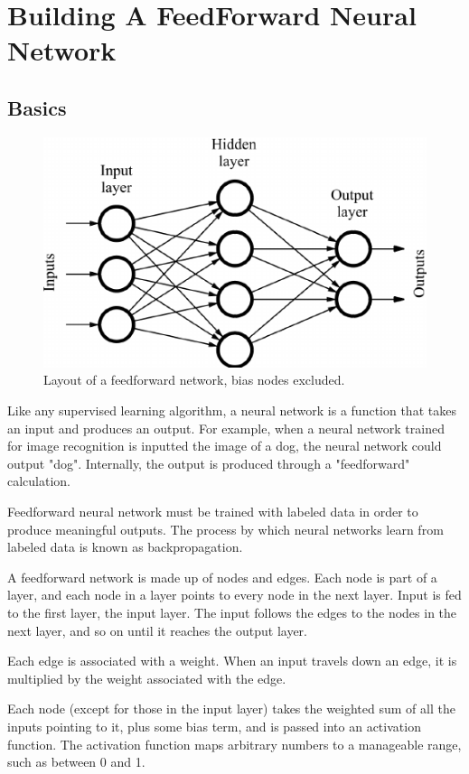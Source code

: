 \documentclass[11pt,onecolumn]{article} %
\begin{document}
	
	\section{Building A FeedForward Neural Network}
	\subsection{Basics}
	
	\begin{figure}[h]
		\centering
		\includegraphics[scale=0.5]{images/network}
		\caption{Layout of a feedforward network, bias nodes excluded.}
	\end{figure}
	
	Like any supervised learning algorithm, a neural network is a function that takes an input and produces an output. For example, when a neural network trained for image recognition is inputted the image of a dog, the neural network could output "dog". Internally, the output is produced through a "feedforward" calculation.
	
	Feedforward neural network must be trained with labeled data in order to produce meaningful outputs. The process by which neural networks learn from labeled data is known as backpropagation.
	
	A feedforward network is made up of nodes and edges. Each node is part of a layer, and each node in a layer points to every node in the next layer. Input is fed to the first layer, the input layer. The input follows the edges to the nodes in the next layer, and so on until it reaches the output layer.
	
	Each edge is associated with a weight. When an input travels down an edge, it is multiplied by the weight associated with the edge.
	
	Each node (except for those in the input layer) takes the weighted sum of all the inputs pointing to it, plus some bias term, and is passed into an activation function. The activation function maps arbitrary numbers to a manageable range, such as between 0 and 1.
	
\end{document}
